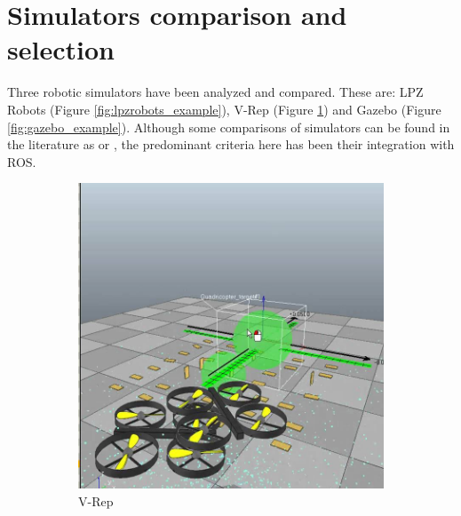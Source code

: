 \section{Simulators comparison and selection} %
\label{sec:sim_comparison_of_simulators}
Three robotic simulators have been analyzed and compared. 
These are: LPZ Robots \cite{lpzrobots} (Figure \ref{fig:lpzrobots_example}), V-Rep \cite{vrep} (Figure \ref{fig:vrep_example}) and Gazebo \cite{gazebo} (Figure \ref{fig:gazebo_example}).
Although some comparisons of simulators can be found in the literature as \cite{nogueiracomparative} or \cite{staranowicz2011survey}, the predominant criteria here has been their integration with ROS.

\begin{figure}[hb!]
  \begin{subfigure}{.33\textwidth}
    \centering
    \includegraphics[width=.95\linewidth]{figures/vrep_example}
    \caption{V-Rep}
    \label{fig:vrep_example}
  \end{subfigure}%
  \begin{subfigure}{.33\textwidth}
    \centering

\end{subfigure}
\end{figure}

